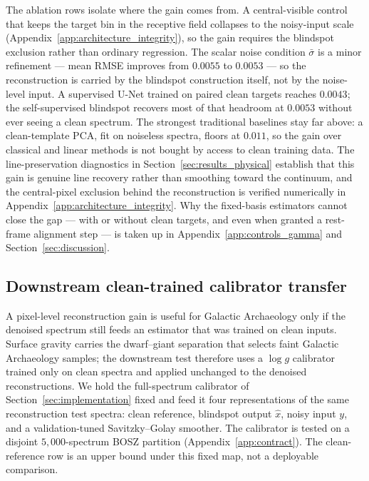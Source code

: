 \documentclass[twocolumn]{aastex7}
\begin{document}
The ablation rows isolate where the gain comes from. A central-visible control that keeps the target bin in the receptive field collapses to the noisy-input scale (Appendix~\ref{app:architecture_integrity}), so the gain requires the blindspot exclusion rather than ordinary regression. The scalar noise condition $\bar{\sigma}$ is a minor refinement --- mean RMSE improves from $0.0055$ to $0.0053$ --- so the reconstruction is carried by the blindspot construction itself, not by the noise-level input. A supervised U-Net trained on paired clean targets reaches $0.0043$; the self-supervised blindspot recovers most of that headroom at $0.0053$ without ever seeing a clean spectrum. The strongest traditional baselines stay far above: a clean-template PCA, fit on noiseless spectra, floors at $0.011$, so the gain over classical and linear methods is not bought by access to clean training data. The line-preservation diagnostics in Section~\ref{sec:results_physical} establish that this gain is genuine line recovery rather than smoothing toward the continuum, and the central-pixel exclusion behind the reconstruction is verified numerically in Appendix~\ref{app:architecture_integrity}. Why the fixed-basis estimators cannot close the gap --- with or without clean targets, and even when granted a rest-frame alignment step --- is taken up in Appendix~\ref{app:controls_gamma} and Section~\ref{sec:discussion}.

\subsection{Downstream clean-trained calibrator transfer}
\label{sec:results_downstream_logg}

A pixel-level reconstruction gain is useful for Galactic Archaeology only if the denoised spectrum still feeds an estimator that was trained on clean inputs. Surface gravity carries the dwarf--giant separation that selects faint Galactic Archaeology samples; the downstream test therefore uses a $\log g$ calibrator trained only on clean spectra and applied unchanged to the denoised reconstructions. We hold the full-spectrum calibrator of Section~\ref{sec:implementation} fixed and feed it four representations of the same reconstruction test spectra: clean reference, blindspot output $\hat{x}$, noisy input $y$, and a validation-tuned Savitzky--Golay smoother. The calibrator is tested on a disjoint $5{,}000$-spectrum BOSZ partition (Appendix~\ref{app:contract}). The clean-reference row is an upper bound under this fixed map, not a deployable comparison.
\end{document}
